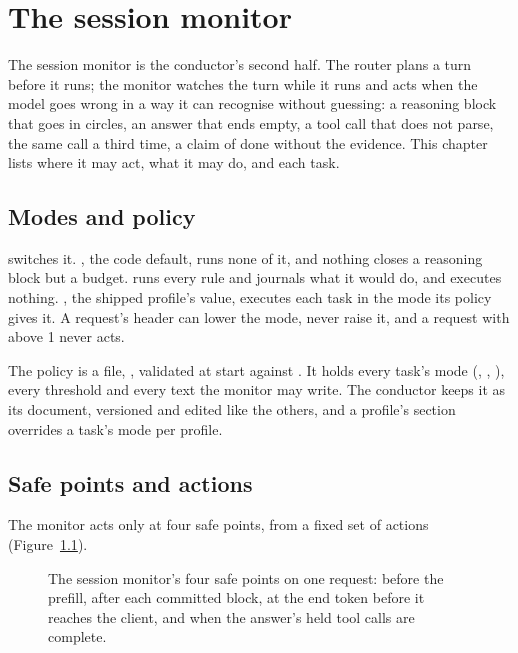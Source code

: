 \chapter{The session monitor}\label{ch:monitor}

The session monitor is the conductor's second half. The router plans a turn before it runs; the monitor watches the turn while it runs and acts when the model goes wrong in a way it can recognise without guessing: a reasoning block that goes in circles, an answer that ends empty, a tool call that does not parse, the same call a third time, a claim of done without the evidence. This chapter lists where it may act, what it may do, and each task.

\section{Modes and policy}

 switches it. , the code default, runs none of it, and nothing closes a reasoning block but a budget.  runs every rule and journals what it would do, and executes nothing. , the shipped profile's value, executes each task in the mode its policy gives it. A request's  header can lower the mode, never raise it, and a request with  above 1 never acts.

The policy is a file, , validated at start against . It holds every task's mode (, , ), every threshold and every text the monitor may write. The conductor keeps it as its  document, versioned and edited like the others, and a profile's  section overrides a task's mode per profile.

\section{Safe points and actions}

The monitor acts only at four safe points, from a fixed set of actions (Figure~\ref{fig:safe-points}).

\begin{figure}[htbp]
\centering

\caption[The monitor's safe points]{The session monitor's four safe points on one request: before the prefill, after each committed block, at the end token before it reaches the client, and when the answer's held tool calls are complete.}\label{fig:safe-points}
\end{figure}

